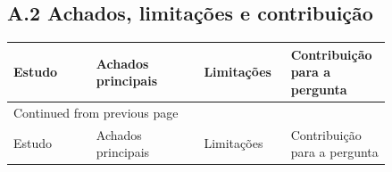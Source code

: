 \documentclass[12pt,a4paper]{article}
\begin{document}
\subsection{A.2 Achados, limitações e contribuição}
\label{sec:orgedc3078}
\begin{landscape}
\footnotesize
\begin{longtable}{p{0.20\linewidth}p{0.26\linewidth}p{0.19\linewidth}p{0.19\linewidth}}
Estudo & Achados principais & Limitações & Contribuição para a pergunta\\
\hline
\endfirsthead
\multicolumn{4}{l}{Continued from previous page} \\
\hline

Estudo & Achados principais & Limitações & Contribuição para a pergunta \\


\end{longtable}
\end{landscape}
\end{document}

